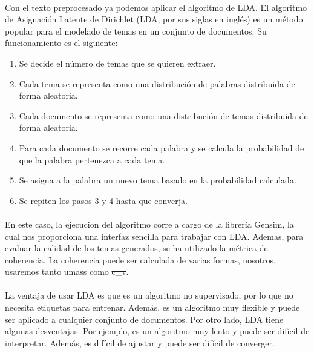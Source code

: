 \documentclass{report}
\begin{document}
                \paragraph*{}{
                    Con el texto preprocesado ya podemos aplicar el algoritmo de LDA.
                    El algoritmo de Asignación Latente de Dirichlet (LDA, por sus siglas en inglés) es un método popular para el modelado de temas en un conjunto de documentos.
                    Su funcionamiento es el siguiente:
                }
                \begin{enumerate}
                    \item Se decide el número de temas que se quieren extraer.
                    \item Cada tema se representa como una distribución de palabras distribuida de forma aleatoria.
                    \item Cada documento se representa como una distribución de temas distribuida de forma aleatoria.
                    \item Para cada documento se recorre cada palabra y se calcula la probabilidad de que la palabra pertenezca a cada tema.
                    \item Se asigna a la palabra un nuevo tema basado en la probabilidad calculada.
                    \item Se repiten los pasos 3 y 4 hasta que converja.
                \end{enumerate}
                \paragraph*{}{
                    En este caso, la ejecucion del algoritmo corre a cargo de la librería Gensim, la cual nos proporciona una interfaz sencilla para trabajar con LDA.
                    Ademas, para evaluar la calidad de los temas generados, se ha utilizado la métrica de coherencia. La coherencia puede ser calculada de varias formas, nosotros, usaremos tanto umass como \st{c\_v}.
                }
                \paragraph*{}{
                    La ventaja de usar LDA es que es un algoritmo no supervisado, por lo que no necesita etiquetas para entrenar. Además, es un algoritmo muy flexible y puede ser aplicado a cualquier conjunto de documentos.
                    Por otro lado, LDA tiene algunas desventajas. Por ejemplo, es un algoritmo muy lento y puede ser difícil de interpretar. Además, es difícil de ajustar y puede ser difícil de converger.
                }
\end{document}
